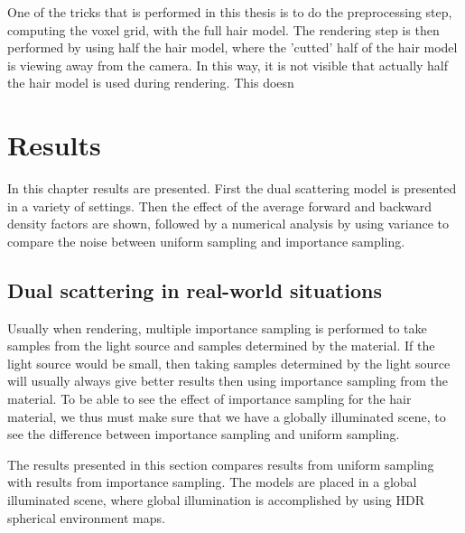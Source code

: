 \documentclass[11pt,a4paper]{report}
\begin{document}
One of the tricks that is performed in this thesis is to do the preprocessing step, computing the voxel grid, with the full hair model. The rendering step is then performed by using half the hair model, where the 'cutted' half of the hair model is viewing away from the camera. In this way, it is not visible that actually half the hair model is used during rendering. This doesn 


\chapter{Results}

In this chapter results are presented. First the dual scattering model is presented in a variety of settings. Then the effect of the average forward and backward density factors are shown, followed by a numerical analysis by using variance to compare the noise between uniform sampling and importance sampling.



%
%

\section{Dual scattering in real-world situations}

Usually when rendering, multiple importance sampling is performed to take samples from the light source and samples determined by the material. If the light source would be small, then taking samples determined by the light source will usually always give better results then using importance sampling from the material. To be able to see the effect of importance sampling for the hair material, we thus must make sure that we have a globally illuminated scene, to see the difference between importance sampling and uniform sampling.

The results presented in this section compares results from uniform sampling with results from importance sampling. The models are placed in a global illuminated scene, where global illumination is accomplished by using HDR spherical environment maps.
\end{document}

